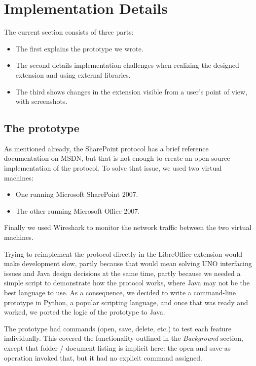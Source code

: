\section{Implementation Details}

The current section consists of three parts:

\begin{itemize}
\item The first explains the prototype we wrote.
\item The second details implementation challenges when realizing the designed extension and using external libraries.
\item The third shows changes in the extension visible from a user's point of view, with screenshots.
\end{itemize}

\subsection{The prototype}

As mentioned already, the SharePoint protocol has a brief reference
documentation on MSDN, but that is not enough to create an open-source
implementation of the protocol. To solve that issue, we used two virtual
machines:

\begin{itemize}
\item One running Microsoft SharePoint 2007.
\item The other running Microsoft Office 2007.
\end{itemize}

Finally we used Wireshark\cite{wireshark} to monitor the network traffic
between the two virtual machines.

Trying to reimplement the protocol directly in the LibreOffice extension would
make development slow, partly because that would mean solving UNO interfacing
issues and Java design decisions at the same time, partly because we needed a
simple script to demonstrate how the protocol works, where Java may not be the
best language to use. As a consequence, we decided to write a command-line
prototype in Python, a popular scripting language, and once that was ready and
worked, we ported the logic of the prototype to Java.

The prototype had commands (open, save, delete, etc.) to test each feature
individually.  This covered the functionality outlined in the \emph{Background}
section, except that folder / document listing is implicit here: the open and
save-as operation invoked that, but it had no explicit command assigned.

